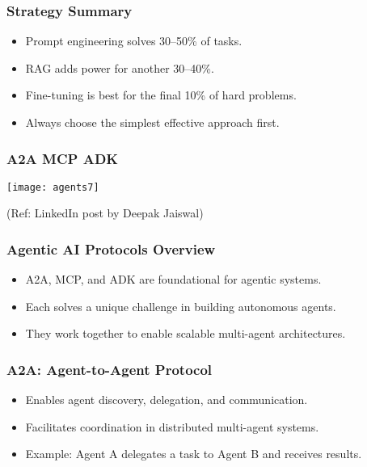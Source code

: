 \begin{frame}[fragile]\frametitle{Strategy Summary}
    \begin{itemize}
        \item Prompt engineering solves 30--50\% of tasks.
        \item RAG adds power for another 30--40\%.
        \item Fine-tuning is best for the final 10\% of hard problems.
        \item Always choose the simplest effective approach first.
    \end{itemize}
\end{frame}

\begin{frame}[fragile]\frametitle{A2A MCP ADK}
	
	\begin{center}
	\texttt{[image: agents7]}
	\end{center}
	
{\tiny (Ref: LinkedIn post by Deepak Jaiswal)}

\end{frame}

\begin{frame}[fragile]\frametitle{Agentic AI Protocols Overview}
    \begin{itemize}
        \item A2A, MCP, and ADK are foundational for agentic systems.
        \item Each solves a unique challenge in building autonomous agents.
        \item They work together to enable scalable multi-agent architectures.
    \end{itemize}
\end{frame}

\begin{frame}[fragile]\frametitle{A2A: Agent-to-Agent Protocol}
    \begin{itemize}
        \item Enables agent discovery, delegation, and communication.
        \item Facilitates coordination in distributed multi-agent systems.
        \item Example: Agent A delegates a task to Agent B and receives results.
    \end{itemize}
\end{frame}

